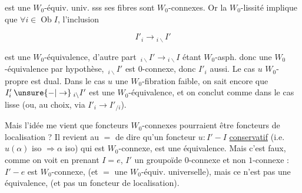  est une $W_0$-équiv. univ. sss ses fibres sont $W_0$-connexes. Or la $W_0$-lissité implique que  $\forall i\in\operatorname{Ob}I$, l'inclusion

\[
 I'_i\longrightarrow{}_{i\backslash}I'
\]

est une $W_0$-équivalence, d'autre part $\,{}_{i\backslash}I'\longrightarrow{}_{i\backslash}I$ étant $W_0$-asph. donc une $W_0$-équivalence\unsure{,} par hypothèse, $\,{}_{i\backslash}I'$ est $0$-connexe, donc $I'_i$ aussi. Le cas $u$ $W_0$-propre est dual. Dans le cas $u$ une $W_0$-fibration faible, on sait encore que  $I'_i\mathbin{\unsure{-|\to}}{}_{i\backslash}I'$ est une $W_0$-équivalence, et on conclut comme dans le cas lisse (ou, au choix, via $I'_i\longrightarrow I'_{/i}$).

Mais l'idée me vient que  foncteurs $W_0$-connexes pourraient être   foncteurs de localisation ? Il revient au $=$ de dire qu'un foncteur $u\colon I'\mathbin{-}I$  \uline{conservatif} (i.e. $u(\alpha)$ iso $\Rightarrow\alpha$ iso) qui est $W_0$-connexe, est une équivalence. Mais c'est faux, comme on voit en prenant $I=e$, $I'$ un groupoïde $0$-connexe et non $1$-connexe : $I'\mathbin{-}e$ est $W_0$-connexe, (et $=$ une $W_0$-équiv. universelle), mais ce n'est pas une équivalence, (et pas un foncteur de localisation).

